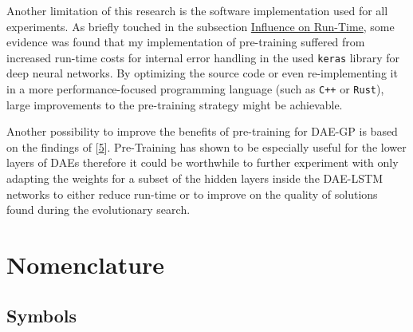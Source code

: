 \documentclass[
  11pt,
]{article}
\begin{document}
Another limitation of this research is the software implementation used for all experiments.
As briefly touched in the subsection \protect\hyperlink{influence-on-run-time-1}{Influence on Run-Time}, some evidence was found that my implementation of pre-training suffered from increased run-time costs for internal error handling in the used \texttt{keras} library for deep neural networks.
By optimizing the source code or even re-implementing it in a more performance-focused programming language (such as \texttt{C++} or \texttt{Rust}), large improvements to the pre-training strategy might be achievable.

Another possibility to improve the benefits of pre-training for DAE-GP is based on the findings of {[}\protect\hyperlink{ref-pmlr-v5-erhan09a}{5}{]}.
Pre-Training has shown to be especially useful for the lower layers of DAEs therefore it could be worthwhile to further experiment with only adapting the weights for a subset of the hidden layers inside the DAE-LSTM networks to either reduce run-time or to improve on the quality of solutions found during the evolutionary search.

\newpage

\hypertarget{II}{%
\section*{Nomenclature}\label{II}}

\hypertarget{IIa}{%
\subsection*{Symbols}\label{IIa}}
\end{document}
